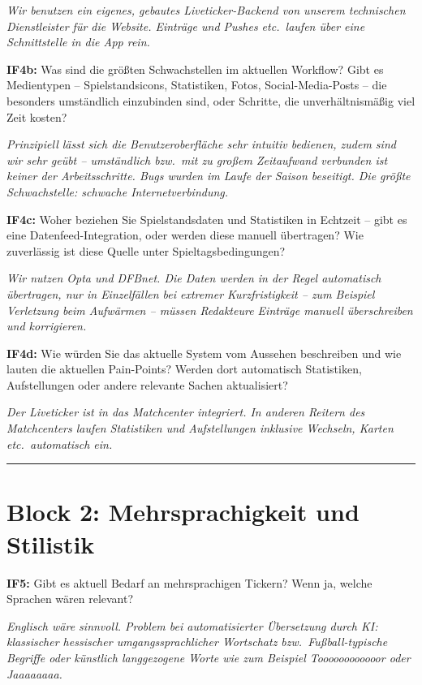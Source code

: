 \textit{Wir benutzen ein eigenes, gebautes Liveticker-Backend von unserem technischen Dienstleister für die Website. Einträge und Pushes etc.\ laufen über eine Schnittstelle in die App rein.}

\textbf{IF4b:} Was sind die größten Schwachstellen im aktuellen Workflow? Gibt es Medientypen -- Spielstandsicons, Statistiken, Fotos, Social-Media-Posts -- die besonders umständlich einzubinden sind, oder Schritte, die unverhältnismäßig viel Zeit kosten?

\textit{Prinzipiell lässt sich die Benutzeroberfläche sehr intuitiv bedienen, zudem sind wir sehr geübt -- umständlich bzw.\ mit zu großem Zeitaufwand verbunden ist keiner der Arbeitsschritte. Bugs wurden im Laufe der Saison beseitigt. Die größte Schwachstelle: schwache Internetverbindung.}

\textbf{IF4c:} Woher beziehen Sie Spielstandsdaten und Statistiken in Echtzeit -- gibt es eine Datenfeed-Integration, oder werden diese manuell übertragen? Wie zuverlässig ist diese Quelle unter Spieltagsbedingungen?

\textit{Wir nutzen Opta und DFBnet. Die Daten werden in der Regel automatisch übertragen, nur in Einzelfällen bei extremer Kurzfristigkeit -- zum Beispiel Verletzung beim Aufwärmen -- müssen Redakteure Einträge manuell überschreiben und korrigieren.}

\textbf{IF4d:} Wie würden Sie das aktuelle System vom Aussehen beschreiben und wie lauten die aktuellen Pain-Points? Werden dort automatisch Statistiken, Aufstellungen oder andere relevante Sachen aktualisiert?

\textit{Der Liveticker ist in das Matchcenter integriert. In anderen Reitern des Matchcenters laufen Statistiken und Aufstellungen inklusive Wechseln, Karten etc.\ automatisch ein.}

\begin{center}\rule{0.5\linewidth}{0.5pt}\end{center}

\section{Block 2: Mehrsprachigkeit und Stilistik}

\textbf{IF5:} Gibt es aktuell Bedarf an mehrsprachigen Tickern? Wenn ja, welche Sprachen wären relevant?

\textit{Englisch wäre sinnvoll. Problem bei automatisierter Übersetzung durch KI: klassischer hessischer umgangssprachlicher Wortschatz bzw.\ Fußball-typische Begriffe oder künstlich langgezogene Worte wie zum Beispiel \glqq{}Toooooooooooor\grqq{} oder \glqq{}Jaaaaaaaa\grqq{}.}

